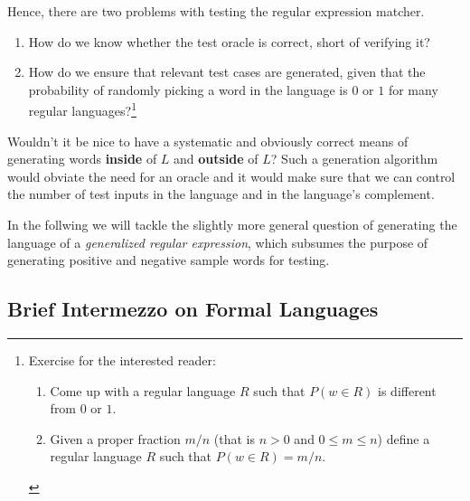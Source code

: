 Hence, there are two problems with testing the regular expression
matcher.
\begin{enumerate}
\item How do we know whether the test oracle is correct, short of
  verifying it?
\item How do we ensure that relevant test cases are generated, given
  that the probability of randomly picking a word in the language is
  $0$ or $1$ for many regular languages?\footnote{Exercise for the
    interested reader:
    \begin{enumerate}
    \item Come up with a regular language $R$ such that $P(w\in R)$ is
      different from $0$ or $1$.
    \item Given a proper fraction $m/n$ (that is $n>0$ and $0\le m\le
      n$) define a regular language $R$ such that $P (w\in R) = m/n$.
    \end{enumerate}
  }
\end{enumerate}


Wouldn't it be nice to have a systematic and obviously correct means
of generating words \textbf{inside} of $L$ and \textbf{outside} of
$L$? Such a generation algorithm would obviate the need for an oracle
and it would make sure that we can control the number of test inputs
in the language and in the language's complement.

In the follwing we will tackle the slightly more general question of generating
the language of a \emph{generalized regular expression}, 
which subsumes the purpose of generating positive and negative sample
words for testing.

\subsection{Brief Intermezzo on Formal Languages}
\label{sec:research-question}

